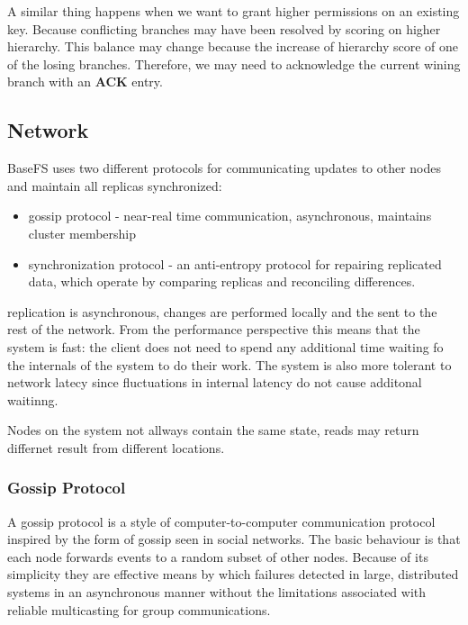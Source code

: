 \documentclass{sig-alternate}
\begin{document}
A similar thing happens when we want to grant higher permissions on an existing key. Because conflicting branches may have been resolved by scoring on higher hierarchy. This balance may change because the increase of hierarchy score of one of the losing branches. Therefore, we may need to acknowledge the current wining branch with an \textbf{ACK} entry.


\subsection{Network} \label{network}

BaseFS uses two different protocols for communicating updates to other nodes and maintain all replicas synchronized:

\begin{itemize}
    \item gossip protocol - near-real time communication, asynchronous, maintains cluster membership
    \item synchronization protocol - an anti-entropy protocol for repairing replicated data, which operate by comparing replicas and reconciling differences.
\end{itemize}

replication is asynchronous, changes are performed locally and the sent to the rest of the network. From the performance perspective this means that the system is fast: the client does not need to spend any additional time waiting fo the internals of the system to do their work. The system is also more tolerant to network latecy since fluctuations in internal latency do not cause additonal waitinng.

Nodes on the system not allways contain the same state, reads may return differnet result from different locations.


\subsubsection{Gossip Protocol}

A gossip protocol is a style of computer-to-computer communication protocol inspired by the form of gossip seen in social networks. The basic behaviour is that each node forwards events to a random subset of other nodes. Because of its simplicity they are effective means by which failures detected in large, distributed systems in an asynchronous manner without the limitations associated with reliable multicasting for group communications. 
\end{document}
